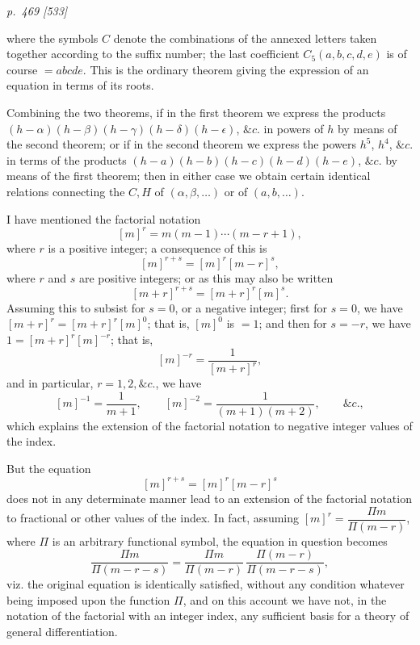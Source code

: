 \documentclass[11pt,a4paper]{article}
\theoremstyle{plain}
\theoremstyle{definition}
\newcommand{\eps}{\epsilon}
\newcommand{\amp}{\&c.}
\begin{document}
\clearpage

\bigskip
\textit{p.~469 [533]}
\smallskip

\noindent

where the symbols \(C\) denote the combinations of the annexed letters taken together
according to the suffix number; the last coefficient \(C_{5}(a,b,c,d,e)\) is of course
\(=abcde\). This is the ordinary theorem giving the expression of an equation in terms of
its roots.

Combining the two theorems, if in the first theorem we express the products
\((h-\alpha)(h-\beta)(h-\gamma)(h-\delta)(h-\eps)\), \(\amp\) in powers of \(h\) by means
of the second theorem; or if in the second theorem we express the powers \(h^{5}\),
\(h^{4}\), \(\amp\) in terms of the products \((h-a)(h-b)(h-c)(h-d)(h-e)\), \(\amp\)
by means of the first theorem; then in either case we obtain certain identical relations
connecting the \(C,H\) of \((\alpha,\beta,\ldots)\) or of \((a,b,\ldots)\).

I have mentioned the factorial notation
\[
[m]^{r}=m(m-1)\cdots(m-r+1),
\]
where \(r\) is a positive integer; a consequence of this is
\[
[m]^{r+s}=[m]^{r}[m-r]^{s},
\]
where \(r\) and \(s\) are positive integers; or as this may also be written
\[
[m+r]^{r+s}=[m+r]^{r}[m]^{s}.
\]
Assuming this to subsist for \(s=0\), or a negative integer; first for \(s=0\), we have
\([m+r]^{r}=[m+r]^{r}[m]^{0}\); that is, \([m]^{0}\) is \(=1\); and then for \(s=-r\),
we have \(1=[m+r]^{r}[m]^{-r}\); that is,
\[
[m]^{-r}=\frac{1}{[m+r]^{r}},
\]
and in particular, \(r=1,2,\amp\), we have
\[
[m]^{-1}=\frac{1}{m+1},
\qquad
[m]^{-2}=\frac{1}{(m+1)(m+2)},
\qquad
\amp,
\]
which explains the extension of the factorial notation to negative integer values of the
index.

But the equation
\[
[m]^{r+s}=[m]^{r}[m-r]^{s}
\]
does not in any determinate manner lead to an extension of the factorial notation to
fractional or other values of the index. In fact, assuming
\([m]^{r}=\dfrac{\Pi m}{\Pi(m-r)}\), where \(\Pi\) is an arbitrary functional symbol, the
equation in question becomes
\[
\frac{\Pi m}{\Pi(m-r-s)}
=\frac{\Pi m}{\Pi(m-r)}\,\frac{\Pi(m-r)}{\Pi(m-r-s)},
\]
viz. the original equation is identically satisfied, without any condition whatever being
imposed upon the function \(\Pi\), and on this account we have not, in the notation of the
factorial with an integer index, any sufficient basis for a theory of general differentiation.

\clearpage
\end{document}
